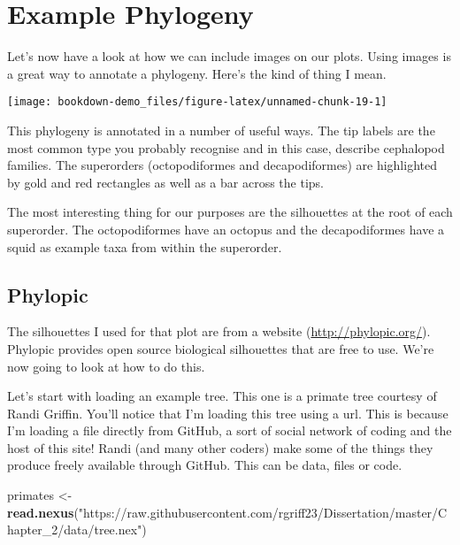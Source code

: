 \documentclass[]{book}
\newenvironment{Shaded}{\begin{snugshade}}{\end{snugshade}}
\newcommand{\KeywordTok}[1]{\textcolor[rgb]{0.13,0.29,0.53}{\textbf{#1}}}
\newcommand{\StringTok}[1]{\textcolor[rgb]{0.31,0.60,0.02}{#1}}
\newcommand{\NormalTok}[1]{#1}
\begin{document}
\section{Example Phylogeny}\label{example-phylogeny}

Let's now have a look at how we can include images on our plots. Using
images is a great way to annotate a phylogeny. Here's the kind of thing
I mean.

\begin{center}\texttt{[image: bookdown-demo\_files/figure-latex/unnamed-chunk-19-1]} \end{center}

This phylogeny is annotated in a number of useful ways. The tip labels
are the most common type you probably recognise and in this case,
describe cephalopod families. The superorders (octopodiformes and
decapodiformes) are highlighted by gold and red rectangles as well as a
bar across the tips.

The most interesting thing for our purposes are the silhouettes at the
root of each superorder. The octopodiformes have an octopus and the
decapodiformes have a squid as example taxa from within the superorder.

\subsection{Phylopic}\label{phylopic}

The silhouettes I used for that plot are from a website
(\url{http://phylopic.org/}). Phylopic provides open source biological
silhouettes that are free to use. We're now going to look at how to do
this.

Let's start with loading an example tree. This one is a primate tree
courtesy of Randi Griffin. You'll notice that I'm loading this tree
using a url. This is because I'm loading a file directly from GitHub, a
sort of social network of coding and the host of this site! Randi (and
many other coders) make some of the things they produce freely available
through GitHub. This can be data, files or code.

\begin{Shaded}
\begin{Highlighting}[]
\NormalTok{primates <-}\StringTok{ }\KeywordTok{read.nexus}\NormalTok{(}\StringTok{"https://raw.githubusercontent.com/rgriff23/Dissertation/master/Chapter_2/data/tree.nex"}\NormalTok{)}
\end{Highlighting}
\end{Shaded}
\end{document}
